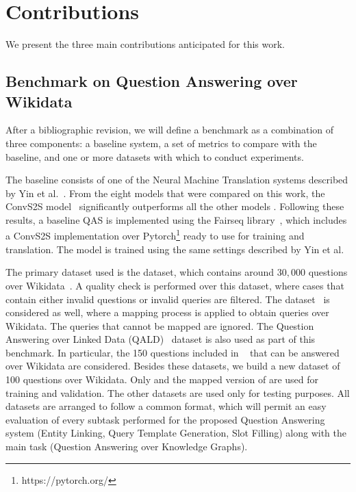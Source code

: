 \section{Contributions}
\label{cap1:intro/contributions}
We present the three main contributions anticipated for this work.
\subsection*{Benchmark on Question Answering over Wikidata}
After a bibliographic revision, we will define a benchmark as a combination of three 
components: a baseline system, a set of metrics to compare with the baseline, and one or 
more datasets with which to conduct experiments.

The baseline consists of one of the Neural Machine Translation systems described by 
Yin et al.~\cite{nmt:nl-to-sparql-Yin19}. From the eight models that were compared on this work, 
the ConvS2S model~\cite{nmt:convS2S-GehringAGYD17} 
significantly outperforms all the other models . Following these results, a baseline QAS is 
implemented using the Fairseq library~\cite{nmt:fairseq-OttEBFGNGA19}, which includes a ConvS2S implementation over 
Pytorch\footnote{https://pytorch.org/} ready to use for training and translation. The model is trained using the same 
settings described by Yin et al.

The primary dataset used is the \LCQuADtwo{} dataset, which contains around $30,000$ 
questions over Wikidata~\cite{dataset:lcquad2-DubeyBA019}. A quality check is performed over this dataset, where cases 
that contain either invalid questions or invalid \SPARQL{} queries are filtered. The \DBNQA{} 
dataset~\cite{dataset:dbnqa-hartmann-marx-soru-2018} is considered as well, where a mapping process is applied to obtain queries over 
Wikidata. The queries that cannot be mapped are ignored. The Question Answering over 
Linked Data (QALD)~\cite{qa:qald-Lopezetal2013} dataset is also used as part of this benchmark. In particular, the 
150 questions included in \QALDseven{}~\cite{dataset:qald7-UsbeckNHKRN17} that can be answered over Wikidata are considered. 
Besides these datasets, we build a new dataset of 100 questions over Wikidata. Only \LCQuADtwo{} 
and the mapped version of \DBNQA{} are used for training and validation. The other 
datasets are used only for testing purposes. All datasets are arranged to follow a common 
format, which will permit an easy evaluation of every subtask performed for the proposed 
Question Answering system (Entity Linking, Query Template Generation, Slot Filling) along 
with the main task (Question Answering over Knowledge Graphs).


